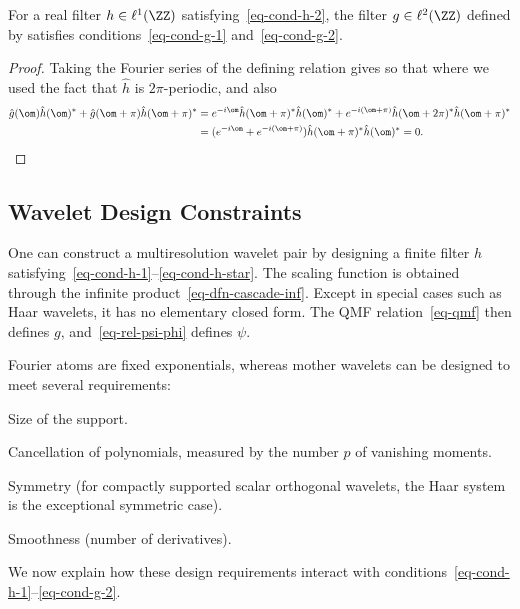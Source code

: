 \begin{prop}
	For a real filter $h\in\ell^1(\ZZ)$ satisfying~\eqref{eq-cond-h-2}, the filter $g \in \ell^2(\ZZ)$ defined by
	satisfies conditions~\eqref{eq-cond-g-1} and~\eqref{eq-cond-g-2}.
\end{prop}

\begin{proof}
	Taking the Fourier series of the defining relation gives
	so that 
	where we used the fact that $\hat h$ is $2\pi$-periodic, 
	and also 
	\begin{align*}
		\hat g(\om) \hat h(\om)^* + \hat g(\om+\pi) \hat h(\om+\pi)^* &= 
		e^{-i \om} \hat h(\om+\pi)^* \hat h(\om)^* + e^{-i (\om+\pi)} \hat h(\om+2\pi)^* \hat h(\om+\pi)^* \\
		&=
		(e^{-i \om}+e^{-i (\om+\pi)}) \hat h(\om+\pi)^* \hat h(\om)^*
		=0.
	\end{align*}
\end{proof}





                                   
\subsection{Wavelet Design Constraints}

One can construct a multiresolution wavelet pair by designing a finite filter $h$ satisfying~\eqref{eq-cond-h-1}--\eqref{eq-cond-h-star}. The scaling function is obtained through the infinite product~\eqref{eq-dfn-cascade-inf}. Except in special cases such as Haar wavelets, it has no elementary closed form. The QMF relation~\eqref{eq-qmf} then defines $g$, and~\eqref{eq-rel-psi-phi} defines $\psi$.

Fourier atoms are fixed exponentials, whereas mother wavelets can be designed to meet several requirements:
\begin{rs}
	\item Size of the support.
	\item Cancellation of polynomials, measured by the number $p$ of vanishing moments.
	\item Symmetry (for compactly supported scalar orthogonal wavelets, the Haar system is the exceptional symmetric case).
	\item Smoothness (number of derivatives).
\end{rs}
We now explain how these design requirements interact with conditions~\eqref{eq-cond-h-1}--\eqref{eq-cond-g-2}.

